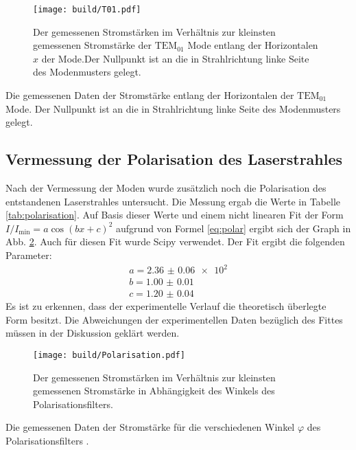 \begin{figure}
	\centering
	\texttt{[image: build/T01.pdf]}
	\caption{Der gemessenen Stromstärken im Verhältnis zur kleinsten gemessenen Stromstärke der $\text{TEM}_{01}$ Mode entlang der Horizontalen $x$ der Mode.Der Nullpunkt ist an die in Strahlrichtung linke Seite des Modenmusters gelegt.}
	\label{fig:T01}
\end{figure}

\begin{table}
	\centering
	\caption{Die gemessenen Daten der Stromstärke entlang der Horizontalen der $\text{TEM}_{\text{01}}$ Mode. Der Nullpunkt ist an die in Strahlrichtung linke Seite des Modenmusters gelegt.}
	
	
	\label{tab:T01}
\end{table}

\subsection{Vermessung der Polarisation des Laserstrahles}
Nach der Vermessung der Moden wurde zusätzlich noch die Polarisation des entstandenen Laserstrahles untersucht. Die Messung ergab die Werte in Tabelle \ref{tab:polarisation}. Auf Basis dieser Werte und einem nicht linearen Fit der Form $I/I_\text{min} = a  \cos(b x + c)^2$
 aufgrund von Formel \eqref{eq:polar} ergibt sich der Graph in Abb. \ref{fig:polarisation}. Auch für diesen Fit wurde Scipy \cite{scipy} verwendet. Der Fit ergibt die folgenden Parameter:
 \begin{gather*}
	a = \num{2.36(6)e2}\\
	b = \num{1.00(1)}\\
	c = \num{1.20(4)}
	\end{gather*}
Es ist zu erkennen, dass der experimentelle Verlauf die theoretisch überlegte Form besitzt. Die Abweichungen der experimentellen Daten bezüglich des Fittes müssen in der Diskussion geklärt werden.
\begin{figure}
	\centering
	\texttt{[image: build/Polarisation.pdf]}
	\caption{Der gemessenen Stromstärken im Verhältnis zur kleinsten gemessenen Stromstärke in Abhängigkeit des Winkels des Polarisationsfilters.}
	\label{fig:polarisation}
\end{figure}


\begin{table}
	\centering
	\caption{Die gemessenen Daten der Stromstärke für die verschiedenen Winkel $\varphi$ des Polarisationsfilters .}
	
	\label{tab:polarisation}
\end{table}


